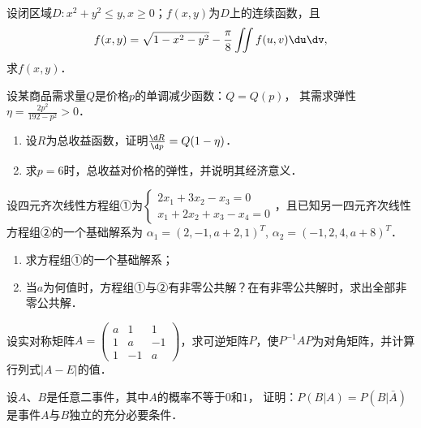 \documentclass[plain,noanswer,medmath]{../../template/jnuexam}
\begin{document}



\begin{problem}
设闭区域$D:{x^2} + {y^2} \leqslant y,x \geqslant 0$；$f(x,y)$为$D$上的连续函数，且
$$f(x,y) = \sqrt {1 - {x^2} - {y^2}}  - \frac{\pi }{8}\iint {f(u,v)\du\dv},$$
求$f(x,y)$．
\end{problem}



\begin{problem}
设某商品需求量$Q$是价格$p$的单调减少函数：$Q = Q(p)$，
其需求弹性$\eta  = \frac{{2{p^2}}}{{192 - {p^2}}} > 0$．
\begin{enumerate}
\item 设$R$为总收益函数，证明$\frac{{\d R}}{{\d p}} = Q(1 - \eta )$．
\item 求$p = 6$时，总收益对价格的弹性，并说明其经济意义．
\end{enumerate}
\end{problem}






\begin{problem}
设四元齐次线性方程组①为$\begin{cases}
  2x_1 + 3x_2 - x_3 = 0 \\
  x_1 + 2x_2 + x_3 - x_4 = 0
\end{cases}$，且已知另一四元齐次线性方程组②的一个基础解系为
$\alpha_1 = (2, - 1,a + 2,1)^T$, $\alpha_2 = (- 1,2,4,a + 8)^T$．
\begin{enumerate}
\item 求方程组①的一个基础解系；
\item 当$a$为何值时，方程组①与②有非零公共解？在有非零公共解时，求出全部非零公共解．
\end{enumerate}
\end{problem}



\begin{problem}
设实对称矩阵$A = \begin{pmatrix}
  a &  1 & 1 \\
  1 &  a & -1 \\
  1 & -1 & a
\end{pmatrix}$，求可逆矩阵$P$，使$P^{-1}AP$为对角矩阵，并计算行列式$|A - E|$的值．
\end{problem}



\begin{problem}
设$A$、$B$是任意二事件，其中$A$的概率不等于$0$和$1$，
证明：$P(B|A) = P(B|\bar A)$是事件$A$与$B$独立的充分必要条件．
\end{problem}



\end{document}
